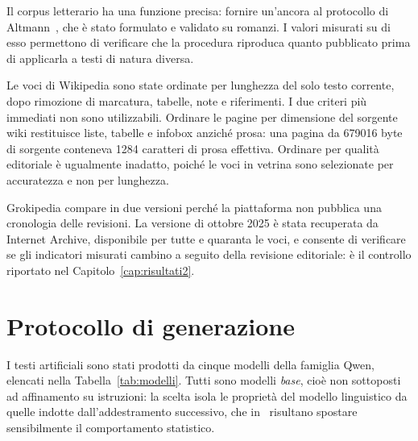 Il corpus letterario ha una funzione precisa: fornire un'ancora al protocollo di
Altmann~\cite{altmann2012}, che è stato formulato e validato su romanzi. I valori
misurati su di esso permettono di verificare che la procedura riproduca quanto
pubblicato prima di applicarla a testi di natura diversa.

Le voci di Wikipedia sono state ordinate per lunghezza del solo testo corrente,
dopo rimozione di marcatura, tabelle, note e riferimenti. I due criteri più
immediati non sono utilizzabili. Ordinare le pagine per dimensione del sorgente
wiki restituisce liste, tabelle e infobox anziché prosa: una pagina da
\num{679016} byte di sorgente conteneva \num{1284} caratteri di prosa effettiva.
Ordinare per qualità editoriale è ugualmente inadatto, poiché le voci in vetrina
sono selezionate per accuratezza e non per lunghezza.

Grokipedia compare in due versioni perché la piattaforma non pubblica una
cronologia delle revisioni. La versione di ottobre 2025 è stata recuperata da
Internet Archive, disponibile per tutte e quaranta le voci, e consente di
verificare se gli indicatori misurati cambino a seguito della revisione
editoriale: è il controllo riportato nel Capitolo~\ref{cap:risultati2}.

\section{Protocollo di generazione}
\label{sec:protocollo}

I testi artificiali sono stati prodotti da cinque modelli della famiglia Qwen,
elencati nella Tabella~\ref{tab:modelli}. Tutti sono modelli \emph{base}, cioè
non sottoposti ad affinamento su istruzioni: la scelta isola le proprietà del
modello linguistico da quelle indotte dall'addestramento successivo, che
in~\cite{mikhaylovskiy2025zipf} risultano spostare sensibilmente il
comportamento statistico.

